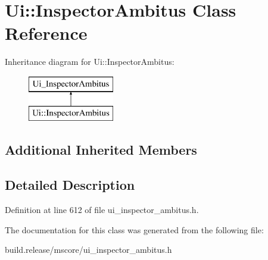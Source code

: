 \hypertarget{class_ui_1_1_inspector_ambitus}{}\section{Ui\+:\+:Inspector\+Ambitus Class Reference}
\label{class_ui_1_1_inspector_ambitus}
Inheritance diagram for Ui\+:\+:Inspector\+Ambitus\+:\begin{figure}[H]
\begin{center}
\leavevmode
\includegraphics[height=2.000000cm]{class_ui_1_1_inspector_ambitus}
\end{center}
\end{figure}
\subsection*{Additional Inherited Members}


\subsection{Detailed Description}


Definition at line 612 of file ui\+\_\+inspector\+\_\+ambitus.\+h.



The documentation for this class was generated from the following file\+:\begin{DoxyCompactItemize}
\item 
build.\+release/mscore/ui\+\_\+inspector\+\_\+ambitus.\+h\end{DoxyCompactItemize}
